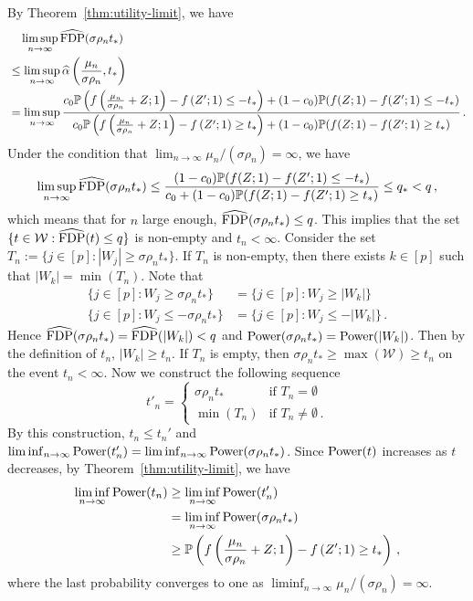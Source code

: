\documentclass[11pt]{article}
\newcommand{\FDP}{{\rm FDP}}
\newcommand{\Power}{{\rm Power}}
\newcommand{\Prob}{\mathbb{P}}
\begin{document}
By Theorem~\ref{thm:utility-limit}, we have
\begin{align*}
    &\quad\limsup_{n\to\infty}\widehat{\FDP}(\sigma\rho_nt_*)\\
    &\le  \limsup_{n\to\infty}\widehat{\alpha}\left(\frac{\mu_n}{\sigma\rho_n},t_*\right)\\
    &=  \limsup_{n\to\infty}\frac{c_0\Prob\left(f\left(\frac{\mu_n}{\sigma\rho_n}+Z;1\right)-f\left(Z';1\right)\leq -t_*\right)+(1-c_0)\Prob(f(Z;1)-f(Z';1)\leq -t_*)}{c_0\Prob\left(f\left(\frac{\mu_n}{\sigma\rho_n}+Z;1\right)-f\left(Z';1\right)\ge t_*\right)+(1-c_0)\Prob(f(Z;1)-f(Z';1)\geq t_*)}\,.
\end{align*}
Under the condition that $\lim_{n\to\infty} \mu_n/(\sigma\rho_n)=\infty$, we have
\[
\limsup_{n\to\infty}\widehat{\FDP}(\sigma\rho_nt_*)\le \frac{(1-c_0)\Prob(f(Z;1)-f(Z';1)\leq -t_*)}{c_0+(1-c_0)\Prob(f(Z;1)-f(Z';1)\geq t_*)}\le q_*<q\,,
\]
which means that for $n$ large enough, $\widehat{\FDP}(\sigma\rho_nt_*)\le q$. This implies that the set $\{t\in\mathcal{W}:\widehat{\FDP}(t)\le q\}$ is non-empty and $t_n<\infty$. Consider the set $T_n:=\{j\in[p]:|W_j|\ge\sigma\rho_nt_*\}$. If $T_n$ is non-empty, then there exists $k\in[p]$ such that $|W_k| = \min (T_n)$. Note that
\begin{align*}
    \{j\in[p]:W_j\ge \sigma\rho_nt_*\} &= \{j\in[p]:W_j\ge |W_k|\} \\
    \{j\in[p]:W_j\le -\sigma\rho_nt_*\} &= \{j\in[p]:W_j\le -|W_k|\}\,.
\end{align*}
Hence $\widehat{{\FDP}}(\sigma\rho_nt_*) = \widehat{\FDP}(|W_k|)<q$ and $\Power(\sigma\rho_nt_*)=\Power(|W_k|)$. Then by the definition of $t_n$, $|W_k|\ge t_n$. If $T_n$ is empty, then $\sigma\rho_nt_*\ge\max(\mathcal{W})\ge t_n$ on the event $t_n<\infty$. Now we construct the following sequence
\[
t'_n = \begin{cases}
    \sigma\rho_nt_* & \mbox{if }T_n=\emptyset\,\\
    \min(T_n) & \mbox{if }T_n\neq \emptyset\,.
    \end{cases}
\]
By this construction, $t_n\le t_n'$ and $\liminf_{n\to\infty}\Power(t_n')=\liminf_{n\to\infty}\Power(\sigma\rho_nt_*)$. Since $\Power(t)$ increases as $t$ decreases, by Theorem~\ref{thm:utility-limit}, we have 
\begin{align*}
    \liminf_{n\to\infty}\Power(t_n)&\ge\liminf_{n\to\infty}\Power(t_n')\\
        &=\liminf_{n\to\infty}\Power(\sigma\rho_n t_*)\\
        &\ge\Prob\left(f\left(\frac{\mu_n}{\sigma\rho_n}+Z;1\right)-f\left(Z';1\right)\ge t_*\right)\,, 
\end{align*}
where the last probability converges to one as $\liminf_{n\to\infty}\mu_n/(\sigma\rho_n)=\infty$.
\end{document}

